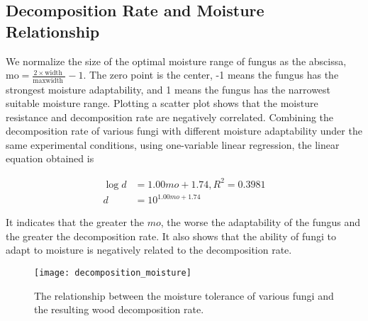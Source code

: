 \documentclass{mcmthesis}
\begin{document}
\subsection{Decomposition Rate and Moisture Relationship}

We normalize the size of the optimal moisture range of fungus as the abscissa, $ \text {mo}=\frac{2 \times \text {width }}{\text {maxwidth }}-1 $. The zero point is the center, -1 means the fungus has the strongest moisture adaptability, and 1 means the fungus has the narrowest suitable moisture range. Plotting a scatter plot shows that the moisture resistance and decomposition rate are negatively correlated. Combining the decomposition rate of various fungi with different moisture adaptability under the same experimental conditions, using one-variable linear regression, the linear equation obtained is 

\begin{equation}
  \begin{split}
    \log {d}&=1.00mo+1.74,R^2=0.3981 \\
    {d}&=10 ^{1.00mo+1.74}
  \end{split}
\end{equation}

It indicates that the greater the $mo $, the worse the adaptability of the fungus and the greater the decomposition rate. It also shows that the ability of fungi to adapt to moisture is negatively related to the decomposition rate. 

\begin{figure}[H]
  \small
  \centering
  \texttt{[image: decomposition\_moisture]}
  \caption{The relationship between the moisture tolerance of various fungi and the resulting wood decomposition rate.}
  \label{decomposition_moisture}
\end{figure}

\end{document}
